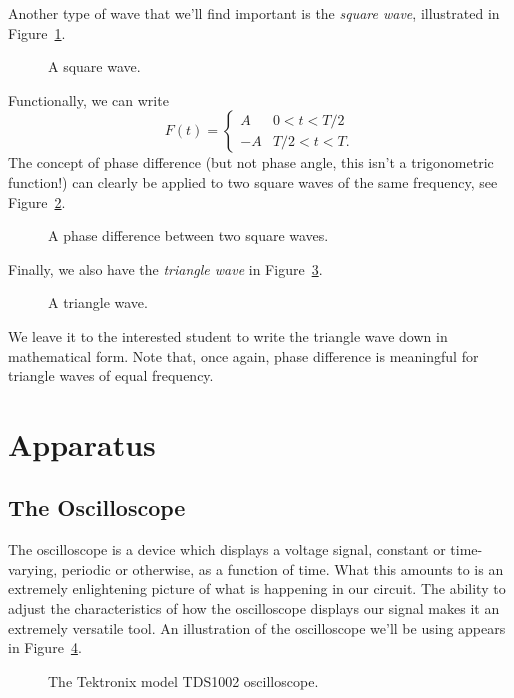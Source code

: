 Another type of wave that we'll find important is the {\it square wave}, 
illustrated in Figure~\ref{fig:scope:squarewave}.
\begin{figure}[htb]
\centerline{\epsfxsize=8cm }
\caption{A square wave.}
\label{fig:scope:squarewave}
\end{figure}
Functionally, we can write
$$ F(t) = \left\{ 
\begin{array}{cc} A & 0<t<T/2 \\ -A & T/2<t<T. \end{array} \right. $$
The concept of phase difference (but not phase angle, this isn't a 
trigonometric function!) can clearly be applied to two square waves of the same
frequency, see Figure~\ref{fig:scope:squarephase}.
\begin{figure}[htb]
\centerline{\epsfxsize=8cm }
\caption{A phase difference between two square waves.}
\label{fig:scope:squarephase}
\end{figure}
Finally, we also have the {\it triangle wave} in 
Figure~\ref{fig:scope:triwave}.
\begin{figure}[htb]
\centerline{\epsfxsize=8cm }
\caption{A triangle wave.}
\label{fig:scope:triwave}
\end{figure}
We leave it to the interested student to write the triangle wave down in 
mathematical form. Note that, once again, phase difference is meaningful for
triangle waves of equal frequency.

\section{Apparatus}

\subsection{The Oscilloscope}

The oscilloscope is a device which displays a voltage signal, constant or 
time-varying, periodic or otherwise, as a function of time.  What this amounts
to is an extremely enlightening picture of what is happening in our circuit.
The ability to adjust the characteristics of how the oscilloscope displays our
signal makes it an extremely versatile tool.  An illustration of the 
oscilloscope we'll be using appears in Figure~\ref{fig:scope:oscope}.
\begin{figure}[htb]
\centerline{\epsfxsize=16cm }
\caption{The Tektronix model TDS1002 oscilloscope.}
\label{fig:scope:oscope}
\end{figure}

